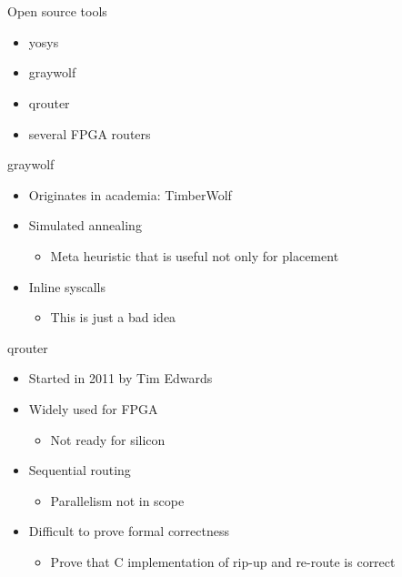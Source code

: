 \documentclass[aspectratio=169]{beamer}
\begin{document}
\section[Silicon compiler]{}
\begin{frame}{Open source tools}
	\begin{itemize}
        \setlength\itemsep{1em}
		\item yosys
		\item graywolf
		\item qrouter
		\item several FPGA routers
	\end{itemize}
\end{frame}

\begin{frame}{graywolf}
	\begin{itemize}
        \setlength\itemsep{1em}
		\item Originates in academia: TimberWolf
		\item Simulated annealing
	        \begin{itemize}
		    \item Meta heuristic that is useful not only for placement
	        \end{itemize}
		\item Inline syscalls
	        \begin{itemize}
		    \item This is just a bad idea
	        \end{itemize}
	\end{itemize}
\end{frame}

\begin{frame}{qrouter}
	\begin{itemize}
        \setlength\itemsep{1em}
		\item Started in 2011 by Tim Edwards 
		\item Widely used for FPGA
	        \begin{itemize}
		    \item Not ready for silicon
	        \end{itemize}
		\item Sequential routing
	        \begin{itemize}
		    \item Parallelism not in scope
	        \end{itemize}
		\item Difficult to prove formal correctness
	        \begin{itemize}
		    \item Prove that C implementation of rip-up and re-route is correct
	        \end{itemize}
	\end{itemize}
\end{frame}
\end{document}
